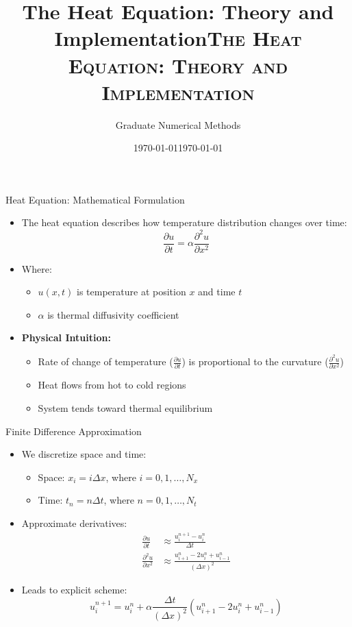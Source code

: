 \documentclass[10pt]{beamer}
\title{The Heat Equation: Theory and Implementation}
\author{Graduate Numerical Methods}
\date{\today}
\title{\textsc{The Heat Equation: Theory and Implementation}}
\date{\today}
\author[Short Name (U ABC)]{%
  \texorpdfstring{%
    \begin{columns}
      \column{\linewidth}
      Swapnil Singh \\ Bank of Lithuania, KTU
    \end{columns}
 }
 {Anu Alexander, Nancy Luke, Kaivan Munshi, Swapnil Singh}
}
\theoremstyle{plain}%
\theoremstyle{definition}
\theoremstyle{remark}
\begin{document}
\begin{frame}
    \titlepage
\end{frame}

\begin{frame}{Heat Equation: Mathematical Formulation}
    \begin{itemize}
        \item The heat equation describes how temperature distribution changes over time:
        \[ \frac{\partial u}{\partial t} = \alpha \frac{\partial^2 u}{\partial x^2} \]
        \item Where:
        \begin{itemize}
            \item $u(x,t)$ is temperature at position $x$ and time $t$
            \item $\alpha$ is thermal diffusivity coefficient
        \end{itemize}
        \vspace{0.5cm}
        \item \textbf{Physical Intuition:}
        \begin{itemize}
            \item Rate of change of temperature ($\frac{\partial u}{\partial t}$) is proportional to the curvature ($\frac{\partial^2 u}{\partial x^2}$)
            \item Heat flows from hot to cold regions
            \item System tends toward thermal equilibrium
        \end{itemize}
    \end{itemize}
\end{frame}

\begin{frame}{Finite Difference Approximation}
    \begin{itemize}
        \item We discretize space and time:
        \begin{itemize}
            \item Space: $x_i = i\Delta x$, where $i = 0,1,\ldots,N_x$
            \item Time: $t_n = n\Delta t$, where $n = 0,1,\ldots,N_t$
        \end{itemize}
        \vspace{0.3cm}
        \item Approximate derivatives:
        \begin{align*}
            \frac{\partial u}{\partial t} &\approx \frac{u_i^{n+1} - u_i^n}{\Delta t} \\
            \frac{\partial^2 u}{\partial x^2} &\approx \frac{u_{i+1}^n - 2u_i^n + u_{i-1}^n}{(\Delta x)^2}
        \end{align*}
        \vspace{0.3cm}
        \item Leads to explicit scheme:
        \[ u_i^{n+1} = u_i^n + \alpha\frac{\Delta t}{(\Delta x)^2}(u_{i+1}^n - 2u_i^n + u_{i-1}^n) \]
    \end{itemize}
\end{frame}
\end{document}
